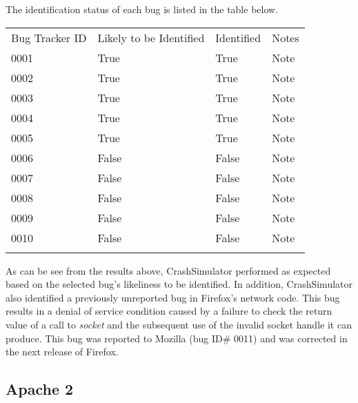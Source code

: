             The identification status of each bug is listed in the table below.

            \begin{table}[H]
                \scriptsize{}
                \begin{tabular}{l  l  l  l}
                    \toprule{}
                        Bug Tracker ID & Likely to be Identified & Identified & Notes \\
                        0001 & True & True & Note \\
                        0002 & True & True & Note \\
                        0003 & True & True & Note \\
                        0004 & True & True & Note \\
                        0005 & True & True & Note \\
                        0006 & False & False & Note \\
                        0007 & False & False & Note \\
                        0008 & False & False & Note \\
                        0009 & False & False & Note \\
                        0010 & False & False & Note \\
                    \bottomrule{}
                \end{tabular}
            \end{table}

            As can be see from the results above, CrashSimulator performed as expected based on the selected bug's
            likeliness to be identified. In addition, CrashSimulator also identified a previously unreported bug in
            Firefox's network code. This bug results in a denial of service condition caused by a failure to check the
            return value of a call to \emph{socket} and the subsequent use of the invalid socket handle it can produce.
            This bug was reported to Mozilla (bug ID# 0011) and was corrected in the next release of Firefox.

        \subsection{Apache 2}


